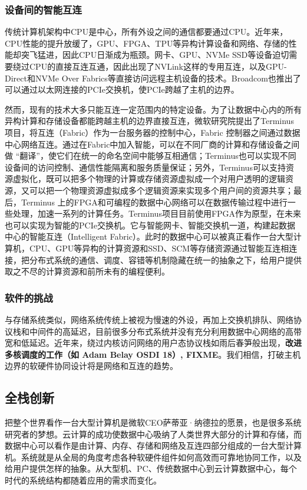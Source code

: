 \subsubsection{设备间的智能互连}

传统计算机架构中CPU是中心，所有外设之间的通信都要通过CPU。近年来，CPU性能的提升放缓了，GPU、FPGA、TPU等异构计算设备和网络、存储的性能却突飞猛进，因此CPU日渐成为瓶颈。网卡、GPU、NVMe SSD等设备迫切需要绕过CPU的直接互连互通，因此出现了NVLink这样的专用互连，以及GPU-Direct和NVMe Over Fabrics等直接访问远程主机设备的技术。Broadcom也推出了可以通过以太网连接的PCIe交换机，使PCIe跨越了主机的边界。

然而，现有的技术大多只能互连一定范围内的特定设备。为了让数据中心内的所有异构计算和存储设备都能跨越主机的边界直接互连，微软研究院提出了Terminus项目，将互连（Fabric）作为一台服务器的控制中心，Fabric 控制器之间通过数据中心网络互连。通过在Fabric中加入智能，可以在不同厂商的计算和存储设备之间做 “翻译”，使它们在统一的命名空间中能够互相通信；Terminus也可以实现不同设备间的访问控制、通信性能隔离和服务质量保证；另外，Terminus可以支持资源虚拟化，既可以把多个物理的计算或存储资源虚拟成一个对用户透明的逻辑资源，又可以把一个物理资源虚拟成多个逻辑资源来实现多个用户间的资源共享；最后，Terminus 上的FPGA和可编程的数据中心网络可以在数据传输过程中进行一些处理，加速一系列的计算任务。Terminus项目目前使用FPGA作为原型，在未来也可以实现为智能的PCIe交换机。它与智能网卡、智能交换机一道，构建起数据中心的智能互连（Intelligent Fabric）。此时的数据中心可以被真正看作一台大型计算机，CPU、GPU等异构的计算资源和SSD、SCM等存储资源通过智能互连相连接，把分布式系统的通信、调度、容错等机制隐藏在统一的抽象之下，给用户提供取之不尽的计算资源和前所未有的编程便利。


\subsubsection{软件的挑战}

与存储系统类似，网络系统传统上被视为慢速的外设，再加上交换机排队、网络协议栈和中间件的高延迟，目前很多分布式系统并没有充分利用数据中心网络的高带宽和低延迟。近年来，绕过内核访问网络的用户态协议栈如雨后春笋般出现，\textbf{改进多核调度的工作（如 Adam Belay OSDI 18）, FIXME}。我们相信，打破主机边界的软硬件协同设计将是网络和互连的趋势。

\subsection{全栈创新}

把整个世界看作一台大型计算机是微软CEO萨蒂亚·纳德拉的愿景，也是很多系统研究者的梦想。云计算的成功使数据中心吸纳了人类世界大部分的计算和存储，而数据中心可以看作是由计算、内存、存储和网络及互连四部分组成的一台大型计算机。系统就是从全局的角度考虑各种软硬件组件如何高效而可靠地协同工作，以及给用户提供怎样的抽象。从大型机、PC、传统数据中心到云计算数据中心，每个时代的系统结构都随着应用的需求而变化。

